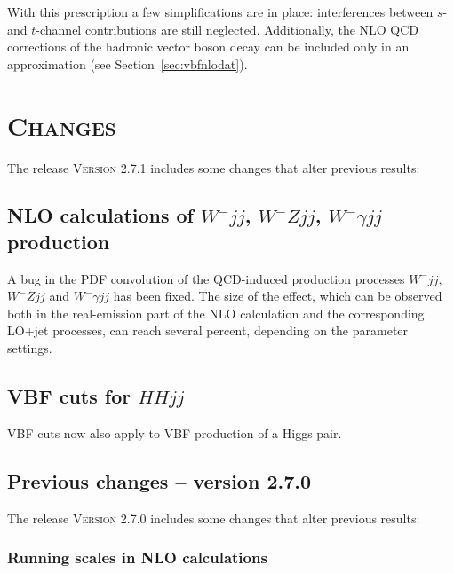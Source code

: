 \documentclass[english,12pt]{article}
\begin{document}
With this prescription a few simplifications are in place: interferences
between $s$- and $t$-channel contributions are still neglected. Additionally,
the NLO QCD corrections of the hadronic vector boson decay can be included only
in an approximation (see Section~\ref{sec:vbfnlodat}).




\newpage

\section{\textsc{Changes}}

The release \textsc{Version 2.7.1} includes some changes that alter previous results:


\subsection{NLO calculations of $W^-jj$, $W^-Zjj$, $W^-\gamma jj$ production}

A bug in the PDF convolution of the QCD-induced production processes $W^-jj$,
$W^-Zjj$ and $W^-\gamma jj$ has been fixed. The size of the effect,
which can be observed both in the real-emission part of the NLO
calculation and the corresponding LO+jet processes, can reach several
percent, depending on the parameter settings.


\subsection{VBF cuts for $HHjj$}

VBF cuts now also apply to VBF production of a Higgs pair.


\subsection{Previous changes -- version 2.7.0}

The release \textsc{Version 2.7.0} includes some changes that alter previous results:


\subsubsection{Running scales in NLO calculations}
\end{document}
